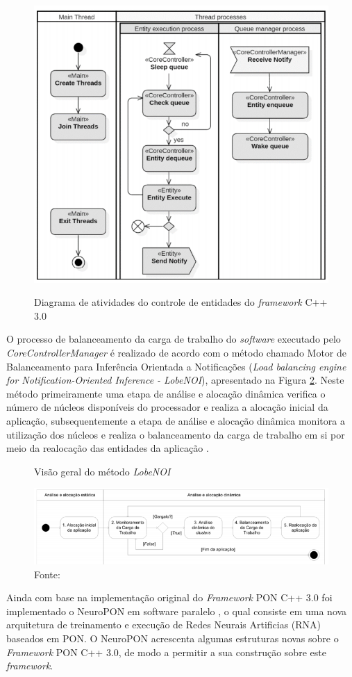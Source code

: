 \begin{figure}[!htb]
  \centering
  \caption{Diagrama de atividades do controle de entidades do \textit{framework}
    C++ 3.0}
  \includegraphics[width=.55\textwidth]{../figures/fw30_flow.png}
  \label{fig:fw3_flow}
\end{figure}

O processo de balanceamento da carga de trabalho do \textit{software} executado
pelo \textit{CoreControllerManager} é realizado de acordo com o método chamado
Motor de Balanceamento para Inferência Orientada a Notificações (\textit{Load
balancing engine for Notification-Oriented Inference - LobeNOI}), apresentado na
Figura \ref{fig:lobenoi}. Neste método primeiramente uma etapa de análise e
alocação dinâmica verifica o número de núcleos disponíveis do processador e
realiza a alocação inicial da aplicação, subsequentemente a etapa de análise e
alocação dinâmica monitora a utilização dos núcleos e realiza o balanceamento da
carga de trabalho em si por meio da realocação das entidades da aplicação
\cite{belmonte_2016}.

\begin{figure}[!htb]
  \centering
  \caption{Visão geral do método \textit{LobeNOI}} \includegraphics[width=\textwidth]{../figures/lobenoi.png}
  \caption*{Fonte:
  }
  \label{fig:lobenoi}
\end{figure}

Ainda com base na implementação original do \textit{Framework} PON C++ 3.0 foi
implementado o NeuroPON em software paralelo \cite{schutz_2018}, o qual consiste
em uma nova arquitetura de treinamento e execução de Redes Neurais Artificias
(RNA) baseados em PON. O NeuroPON acrescenta algumas estruturas novas sobre o
\textit{Framework} PON C++ 3.0, de modo a permitir a sua construção sobre este
\textit{framework}.


